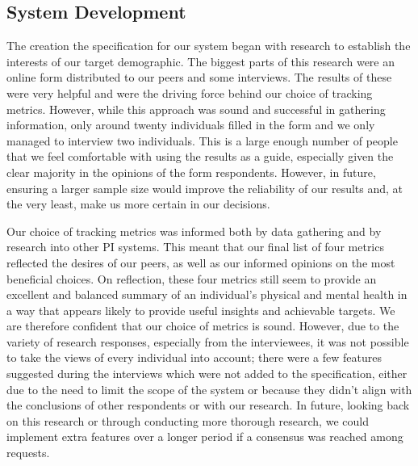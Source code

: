 \documentclass[12pt]{article}
\begin{document}
\subsection{System Development}
The creation the specification for our system began with research to establish 
the interests of our target demographic. The biggest parts of this research 
were an online form distributed to our peers and some interviews. The results 
of these were very helpful and were the driving force behind our choice of 
tracking metrics. However, while this approach was sound and successful in 
gathering information, only around twenty individuals filled in the form and 
we only managed to interview two individuals. This is a large enough number of 
people that we feel comfortable with using the results as a guide, especially 
given the clear majority in the opinions of the form respondents. However, in 
future, ensuring a larger sample size would improve the reliability of our 
results and, at the very least, make us more certain in our decisions.\par

Our choice of tracking metrics was informed both by data gathering and by 
research into other PI systems. This meant that our final list of four metrics 
reflected the desires of our peers, as well as our informed opinions on the 
most beneficial choices. On reflection, these four metrics still seem to 
provide an excellent and balanced summary of an individual's physical and 
mental health in a way that appears likely to provide useful insights and 
achievable targets. We are therefore confident that our choice of metrics is 
sound. However, due to the variety of research responses, especially from the 
interviewees, it was not possible to take the views of every individual into 
account; there were a few features suggested during the interviews which were 
not added to the specification, either due to the need to limit the scope of 
the system or because they didn't align with the conclusions of other 
respondents or with our research. In future, looking back on this research or 
through conducting more thorough research, we could implement extra features 
over a longer period if a consensus was reached among requests.\par
\end{document}

